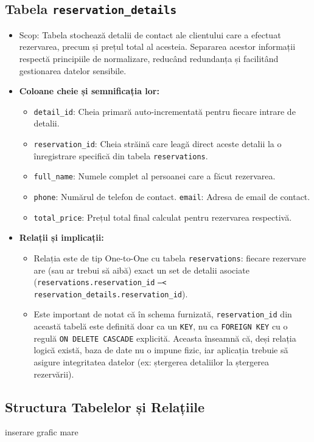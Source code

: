 \documentclass[12pt, a4paper, oneside, romanian]{teza-upb}
\begin{document}
\subsection{Tabela \texttt{reservation\_details}}
\begin{itemize}
	\item Scop: Tabela stochează detalii de contact ale clientului care a efectuat rezervarea, precum și prețul total al acesteia. Separarea acestor informații respectă principiile de normalizare, reducând redundanța și facilitând gestionarea datelor sensibile.
	\item \textbf{Coloane cheie și semnificația lor:}
	\begin{itemize}
		\item \texttt{detail\_id}: Cheia primară auto-incrementată pentru fiecare intrare de detalii.
		\item \texttt{reservation\_id}: Cheia străină care leagă direct aceste detalii la o înregistrare specifică din tabela \texttt{reservations}.
		\item \texttt{full\_name}: Numele complet al persoanei care a făcut rezervarea.
		\item \texttt{phone}: Numărul de telefon de contact.
		\texttt{email}: Adresa de email de contact.
		\item \texttt{total\_price}: Prețul total final calculat pentru rezervarea respectivă.
	\end{itemize}
	\item \textbf{Relații și implicații:}
	\begin{itemize}
		\item Relația este de tip One-to-One cu tabela \texttt{reservations}: fiecare rezervare are (sau ar trebui să aibă) exact un set de detalii asociate (\texttt{reservations.reservation\_id} \texttt{--<} \texttt{reservation\_details.reservation\_id}).
		\item Este important de notat că în schema furnizată, \texttt{reservation\_id} din această tabelă este definită doar ca un \texttt{KEY}, nu ca \texttt{FOREIGN KEY} cu o regulă \texttt{ON DELETE CASCADE} explicită. Aceasta înseamnă că, deși relația logică există, baza de date nu o impune fizic, iar aplicația trebuie să asigure integritatea datelor (ex: ștergerea detaliilor la ștergerea rezervării).
	\end{itemize}
\end{itemize}


\subsection{Structura Tabelelor și Relațiile}
inserare grafic mare
\end{document}
